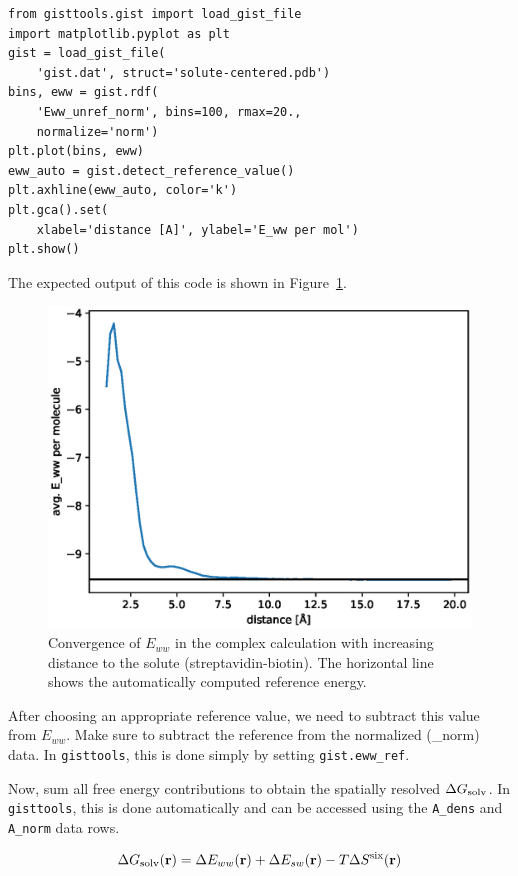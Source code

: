 \documentclass[9pt,tutorial]{livecoms}
\newcommand{\dgsolv}{\Delta G_\textup{solv}}
\newcommand{\software}{\texttt}
\newcommand\inlinecode{\texttt}
\begin{document}
\begin{lstlisting}[style=python]
from gisttools.gist import load_gist_file
import matplotlib.pyplot as plt
gist = load_gist_file(
    'gist.dat', struct='solute-centered.pdb')
bins, eww = gist.rdf(
    'Eww_unref_norm', bins=100, rmax=20.,
    normalize='norm')
plt.plot(bins, eww)
eww_auto = gist.detect_reference_value()
plt.axhline(eww_auto, color='k')
plt.gca().set(
    xlabel='distance [A]', ylabel='E_ww per mol')
plt.show()
\end{lstlisting}

The expected output of this code is shown in Figure~\ref{fig_ewwref}.
\begin{figure}
	\centering
	\includegraphics[width=0.8\linewidth]{figures/Eww_convergence.eps}
	\caption{Convergence of $E_{ww}$ in the complex calculation with increasing distance to the solute (streptavidin-biotin). The horizontal line shows the automatically computed reference energy.}\label{fig_ewwref}
\end{figure}

After choosing an appropriate reference value, we need to subtract this value from $E_{ww}$.
Make sure to subtract the reference from the normalized (\_norm) data.
In \software{gisttools}, this is done simply by setting \inlinecode{gist.eww\_ref}.

Now, sum all free energy contributions to obtain the spatially resolved $\dgsolv$.
In \software{gisttools}, this is done automatically and can be accessed using the \inlinecode{A\_dens} and \inlinecode{A\_norm} data rows.

\newcommand{\coordinate}{\mathbf{r}}
\begin{equation}
	\dgsolv(\coordinate) = \Delta E_{ww}(\coordinate) + \Delta E_{sw}(\coordinate) - T\Delta S^\text{six}(\coordinate)
\end{equation}
\end{document}
